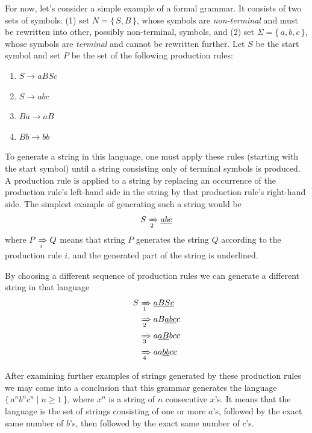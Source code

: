 \documentclass[english,engineering]{wizthesis}
\begin{document}
For now, let's consider a simple example of a formal grammar. It consists of two
sets of symbols: (1) set $N = \{\,S, B\,\}$, whose symbols are
\emph{non-terminal} and must be rewritten into other, possibly non-terminal,
symbols, and (2) set $\Sigma = \{\,a, b, c\,\}$, whose symbols are
\emph{terminal} and cannot be rewritten further. Let $S$ be the start symbol
and set $P$ be the set of the following production rules:
\begin{enumerate}[noitemsep]
  \item $S \rightarrow aBSc$
  \item $S \rightarrow abc$
  \item $Ba \rightarrow aB$
  \item $Bb \rightarrow bb$
\end{enumerate}
To generate a string in this language, one must apply these rules (starting with
the start symbol) until a string consisting only of terminal symbols is
produced. A production rule is applied to a string by replacing an occurrence
of the production rule's left-hand side in the string by that production rule's
right-hand side. The simplest example of generating such a string would be
\begin{equation*}
  S \xRightarrow[2]{} \underline{abc}
\end{equation*}
where $P \xRightarrow[i]{} Q$ means that string $P$ generates the string $Q$
according to the production rule $i$, and the generated part of the string
is underlined.

By choosing a different sequence of production rules we can generate a different
string in that language
\begin{equation*}
\begin{split}
  S & \xRightarrow[1]{} \underline{aBSc} \\
    & \xRightarrow[2]{} aB\underline{abc}c \\
    & \xRightarrow[3]{} a\underline{aB}bcc \\
    & \xRightarrow[4]{} aa\underline{bb}cc
\end{split}
\end{equation*}

After examining further examples of strings generated by these production rules
we may come into a conclusion that this grammar generates the language
$\{\,a^nb^nc^n \mid n \ge 1\,\}$, where $x^n$ is a string of $n$ consecutive $x$'s.
It means that the language is the set of strings consisting of one or more
$a$'s, followed by the exact same number of $b$'s, then followed by the exact
same number of $c$'s.
\end{document}
